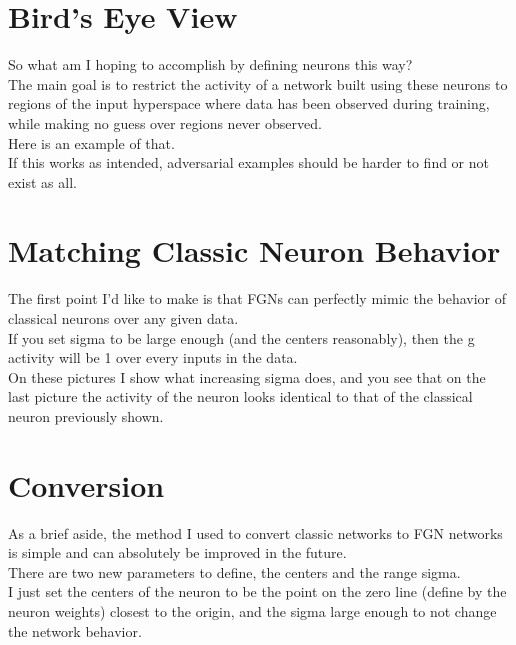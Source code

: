 \documentclass{article}
\begin{document}
\section{Bird's Eye View}
So what am I hoping to accomplish by defining neurons this way?\\
The main goal is to restrict the activity of a network built using these neurons to regions of the input hyperspace where data has been observed during training, while making no guess over regions never observed.\\
Here is an example of that.\\
If this works as intended, adversarial examples should be harder to find or not exist as all.

\section{Matching Classic Neuron Behavior}
The first point I'd like to make is that FGNs can perfectly mimic the behavior of classical neurons over any given data.\\
If you set sigma to be large enough (and the centers reasonably), then the g activity will be 1 over every inputs in the data.\\
On these pictures I show what increasing sigma does, and you see that on the last picture the activity of the neuron looks identical to that of the classical neuron previously shown.

\section{Conversion}
As a brief aside, the method I used to convert classic networks to FGN networks is simple and can absolutely be improved in the future.\\
There are two new parameters to define, the centers and the range sigma.\\
I just set the centers of the neuron to be the point on the zero line (define by the neuron weights) closest to the origin, and the sigma large enough to not change the network behavior.
\end{document}
